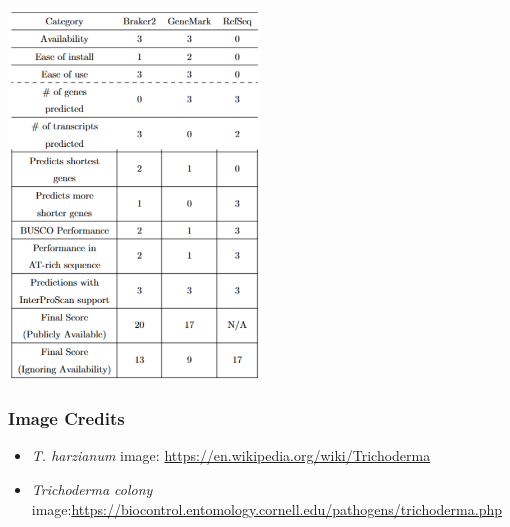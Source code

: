 \documentclass[t]{beamer}
\begin{document}
\begin{frame}
	\vspace{0.75cm}
	\centering
	\includegraphics[width=0.5\textwidth]{../../working-thesis/figures/conclusion-snip.png}
\end{frame}

\begin{frame}
	\frametitle{Image Credits}
	\begin{itemize}
		\item \textit{T. harzianum} image: \url{https://en.wikipedia.org/wiki/Trichoderma}
		\item \textit{Trichoderma colony} image:\url{https://biocontrol.entomology.cornell.edu/pathogens/trichoderma.php}
	\end{itemize}
\end{frame}
\end{document}
